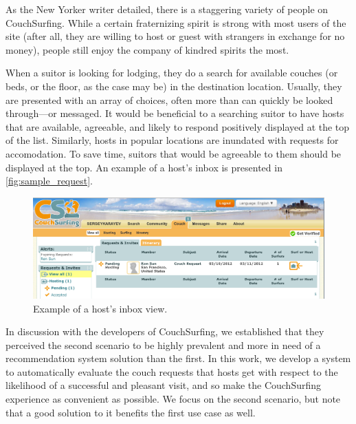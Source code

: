 As the New Yorker writer detailed, there is a staggering variety of people on CouchSurfing.
While a certain fraternizing spirit is strong with most users of the site (after all, they are willing to host or guest with strangers in exchange for no money), people still enjoy the company of kindred spirits the most.

When a suitor is looking for lodging, they do a search for available couches (or beds, or the floor, as the case may be) in the destination location.
Usually, they are presented with an array of choices, often more than can quickly be looked through---or messaged.
It would be beneficial to a searching suitor to have hosts that are available, agreeable, and likely to respond positively displayed at the top of the list.
Similarly, hosts in popular locations are inundated with requests for accomodation.
To save time, suitors that would be agreeable to them should be displayed at the top.
An example of a host's inbox is presented in \autoref{fig:sample_request}.

\begin{figure}[ht]
\centering
\includegraphics[width=1\linewidth]{figures/screenshots/requests.png}
\caption{Example of a host's inbox view.}
\label{fig:sample_request}
\end{figure}

In discussion with the developers of CouchSurfing, we established that they perceived the second scenario to be highly prevalent and more in need of a recommendation system solution than the first.
In this work, we develop a system to automatically evaluate the couch requests that hosts get with respect to the likelihood of a successful and pleasant visit, and so make the CouchSurfing experience as convenient as possible.
We focus on the second scenario, but note that a good solution to it benefits the first use case as well.